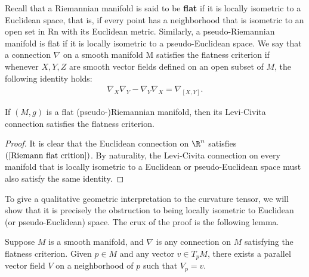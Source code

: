 Recall that a Riemannian manifold is said to be \textbf{flat} if it is locally isometric to a Euclidean space, that is, if every point has a neighborhood that is 
isometric to an open set in Rn with its Euclidean metric. Similarly, a pseudo-Riemannian manifold is flat if it is locally isometric to a pseudo-Euclidean space. 
We say that a connection $\nabla$ on a smooth manifold M satisfies the flatness criterion if whenever $X,Y,Z$ are smooth vector fields defined on an open subset of 
$M$, the following identity holds:
\begin{align}\label{Riemann flat crition}
\nabla_X\nabla_Y-\nabla_Y\nabla_X=\nabla_{[X,Y]}.
\end{align}
\begin{proposition}
 If $(M,g)$ is a flat (pseudo-)Riemannian manifold, then its Levi-Civita connection satisfies the flatness criterion.
\end{proposition}
\begin{proof}
It is clear that the Euclidean connection on $\R^n$ satisfies $(\ref{Riemann flat crition})$. By naturality, the Levi-Civita connection on every manifold that is 
locally isometric to a Euclidean or pseudo-Euclidean space must also satisfy the same identity.
\end{proof}
To give a qualitative geometric interpretation to the curvature tensor, we will show that it is precisely the obstruction to being locally isometric to Euclidean 
(or pseudo-Euclidean) space. The crux of the proof is the following lemma.
\begin{lemma}\label{Riemann parallel extension lem}
Suppose $M$ is a smooth manifold, and $\nabla$ is any connection on $M$ satisfying the flatness criterion. Given $p\in M$ and any vector $v\in T_pM$, there exists a 
parallel vector field $V$ on a neighborhood of $p$ such that $V_p=v$.
\end{lemma}
